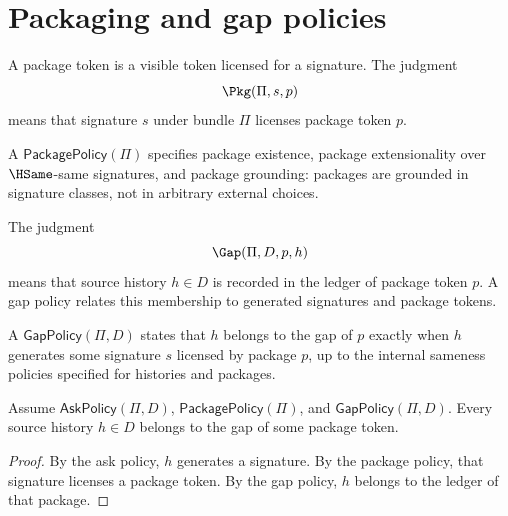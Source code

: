 \section{Packaging and gap policies}

\begin{definition}
A package token is a visible token licensed for a signature.  The judgment
$$
\Pkg(\Pi,s,p)
$$
means that signature \(s\) under bundle \(\Pi\) licenses package token \(p\).
\end{definition}

\begin{definition}
\label{def:proof-sprint-package-policy}
A \(\mathsf{PackagePolicy}(\Pi)\) specifies package existence, package extensionality over \(\HSame\)-same signatures, and package grounding: packages are grounded in signature classes, not in arbitrary external choices.
\end{definition}
\begin{definition}
The judgment
$$
\Gap(\Pi,D,p,h)
$$
means that source history \(h\in D\) is recorded in the ledger of package token \(p\).  A gap policy relates this membership to generated signatures and package tokens.
\end{definition}

\begin{definition}
A \(\mathsf{GapPolicy}(\Pi,D)\) states that \(h\) belongs to the gap of \(p\) exactly when \(h\) generates some signature \(s\) licensed by package \(p\), up to the internal sameness policies specified for histories and packages.
\end{definition}

\begin{theorem}
\label{thm:gap-ledgers-not-optional}
Assume \(\mathsf{AskPolicy}(\Pi,D)\), \(\mathsf{PackagePolicy}(\Pi)\), and \(\mathsf{GapPolicy}(\Pi,D)\).  Every source history \(h\in D\) belongs to the gap of some package token.
\end{theorem}
\begin{proof}
By the ask policy, \(h\) generates a signature.  By the package policy, that signature licenses a package token.  By the gap policy, \(h\) belongs to the ledger of that package.
\end{proof}

